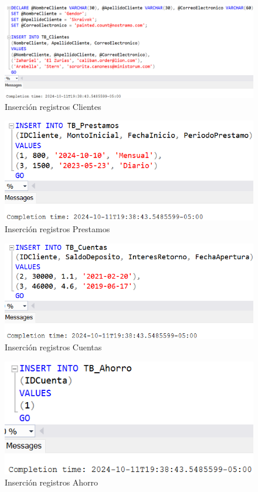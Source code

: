 \begin{figure}[H]
  \centering
  \includegraphics[scale = 0.5]{Imagenes/SQL/4.Insertar_registros/insertar_tb_clientes.png}
  \caption{Inserción registros Clientes}
\end{figure}

\begin{figure}[H]
  \centering
  \includegraphics[scale = 0.5]{Imagenes/SQL/4.Insertar_registros/insertar_tb_prestamos.png}
  \caption{Inserción registros Prestamos}
\end{figure}

\begin{figure}[H]
  \centering
  \includegraphics[scale = 0.5]{Imagenes/SQL/4.Insertar_registros/insertar_tb_cuentas.png}
  \caption{Inserción registros Cuentas}
\end{figure}

\begin{figure}[H]
  \centering
  \includegraphics[scale = 0.5]{Imagenes/SQL/4.Insertar_registros/insertar_tb_ahorro.png}
  \caption{Inserción registros Ahorro}
\end{figure}

